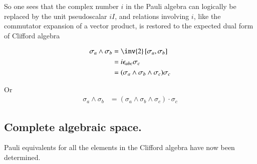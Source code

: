 \documentclass{article}
\newcommand{\antisymmetric}[2]{\left[{#1},{#2}\right]}
\begin{document}
So one sees that the complex number $i$ in the Pauli algebra can logically be
replaced by the unit pseudoscalar $i I$, and relations involving $i$, like the 
commutator expansion of a vector product, is restored to the expected
dual form of Clifford algebra

\begin{align*}
\sigma_a \wedge \sigma_b 
&= \inv{2} \antisymmetric{\sigma_a}{\sigma_b} \\
&= i \epsilon_{a b c} \sigma_c \\
&= (\sigma_a \wedge \sigma_b \wedge \sigma_c) \sigma_c \\
\end{align*}

Or
\begin{align}\label{eqn:dualBivector}
\sigma_a \wedge \sigma_b &= (\sigma_a \wedge \sigma_b \wedge \sigma_c) \cdot \sigma_c
\end{align}

\subsection{ Complete algebraic space. }

Pauli equivalents for all the elements in the Clifford algebra have now been
determined.
\end{document}
